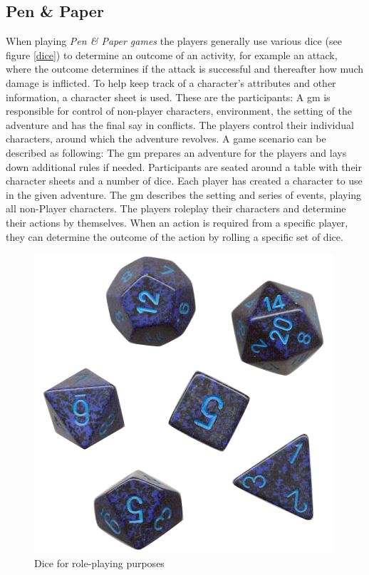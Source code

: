 \subsection{Pen \& Paper}
When playing \emph{Pen \& Paper games} the players generally use various dice (see figure \vref{dice}) to determine an outcome of an activity, for example an attack, where the outcome determines if the attack is successful and thereafter how much damage is inflicted. To help keep track of a character's attributes and other information, a character sheet is used.
These are the participants: A \ac{gm} is responsible for control of non-player characters, environment, the setting of the adventure and has the final say in conflicts. The players control their individual characters, around which the adventure revolves.
A game scenario can be described as following: The \ac{gm} prepares an adventure for the players and lays down additional rules if needed. Participants are seated around a table with their character sheets and a number of dice. Each player has created a character to use in the given adventure. The \ac{gm} describes the setting and series of events, playing all non-Player characters. The players roleplay their characters and determine their actions by themselves. When an action is required from a specific player, they can determine the outcome of the action by rolling a specific set of dice.
\begin{figure}[!h]
\centering
\includegraphics[scale=0.35]{img/rpgdice.png}
\caption{Dice for role-playing purposes}
\label{dice}
\end{figure}

